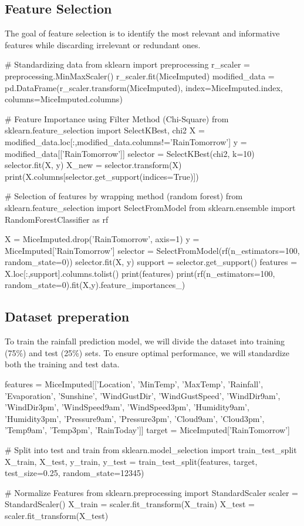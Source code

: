 \documentclass{josis}
\begin{document}
\subsection{Feature Selection}
The goal of feature selection is to identify the most relevant and informative features while discarding irrelevant or redundant ones.
\begin{python}
# Standardizing data
from sklearn import preprocessing
r_scaler = preprocessing.MinMaxScaler()
r_scaler.fit(MiceImputed)
modified_data = pd.DataFrame(r_scaler.transform(MiceImputed), index=MiceImputed.index, columns=MiceImputed.columns)
\end{python}
\begin{python}
# Feature Importance using Filter Method (Chi-Square)
from sklearn.feature_selection import SelectKBest, chi2
X = modified_data.loc[:,modified_data.columns!='RainTomorrow']
y = modified_data[['RainTomorrow']]
selector = SelectKBest(chi2, k=10)
selector.fit(X, y)
X_new = selector.transform(X)
print(X.columns[selector.get_support(indices=True)])
\end{python}
\begin{python}
# Selection of features by wrapping method (random forest)
from sklearn.feature_selection import SelectFromModel
from sklearn.ensemble import RandomForestClassifier as rf

X = MiceImputed.drop('RainTomorrow', axis=1)
y = MiceImputed['RainTomorrow']
selector = SelectFromModel(rf(n_estimators=100, random_state=0))
selector.fit(X, y)
support = selector.get_support()
features = X.loc[:,support].columns.tolist()
print(features)
print(rf(n_estimators=100, random_state=0).fit(X,y).feature_importances_)
\end{python}


\subsection{Dataset preperation}
To train the rainfall prediction model, we will divide the dataset into training (75\%) and test (25\%) sets. To ensure optimal performance, we will standardize both the training and test data.
\begin{python}
features = MiceImputed[['Location', 'MinTemp', 'MaxTemp', 'Rainfall', 'Evaporation', 'Sunshine', 'WindGustDir', 
                        'WindGustSpeed', 'WindDir9am', 'WindDir3pm', 'WindSpeed9am', 'WindSpeed3pm', 
                        'Humidity9am', 'Humidity3pm', 'Pressure9am', 'Pressure3pm', 'Cloud9am', 
                        'Cloud3pm', 'Temp9am', 'Temp3pm', 'RainToday']]
target = MiceImputed['RainTomorrow']

# Split into test and train
from sklearn.model_selection import train_test_split
X_train, X_test, y_train, y_test = train_test_split(features, target, test_size=0.25, random_state=12345)

# Normalize Features
from sklearn.preprocessing import StandardScaler
scaler = StandardScaler()
X_train = scaler.fit_transform(X_train)
X_test = scaler.fit_transform(X_test)
\end{python}
\end{document}
